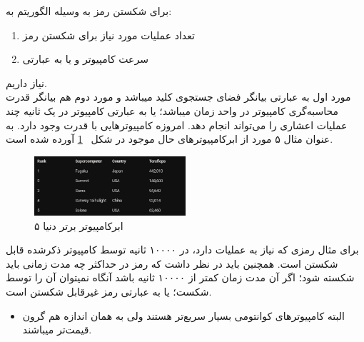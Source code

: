 \documentclass{article}
\begin{document}
برای شکستن رمز به وسیله الگوریتم  به:
\begin{enumerate}
\item تعداد عملیات مورد نیاز برای شکستن رمز
\item سرعت کامپیوتر و یا به عبارتی 
\end{enumerate}
نیاز داریم. \\
مورد اول به عبارتی بیانگر فضای جستجوی کلید میباشد و مورد دوم هم بیانگر قدرت محاسبه‌گری کامپیوتر در واحد زمان میباشد؛ یا به عبارتی کامپیوتر در یک ثانیه چند عملیات اعشاری را می‌تواند انجام دهد. امروزه کامپیوترهایی با قدرت  وجود دارد.
به عنوان مثال ۵ مورد از ابرکامپیوترهای حال موجود در شکل ~\ref{fig1} آورده شده است.
\begin{figure}[h]
\centering
\includegraphics[width=0.5\textwidth]{1.png}
\caption{۵ ابرکامپیوتر برتر دنیا}
\label{fig1}
\end{figure}
برای مثال رمزی که نیاز به  عملیات دارد، در ۱۰۰۰۰ ثانیه توسط کامپیوتر ذکرشده قابل شکستن است. همچنین باید در نظر داشت که رمز در حداکثر چه مدت زمانی باید شکسته شود؛ اگر آن مدت زمان کمتر از ۱۰۰۰۰ ثانیه باشد آنگاه نمیتوان آن را توسط  شکست؛ یا به عبارتی رمز غیرقابل شکستن است.
\begin{itemize}
\item البته کامپیوترهای کوانتومی بسیار سریع‌تر هستند ولی به همان اندازه هم گرون قیمت‌تر میباشند.
\end{itemize}
\newpage
\end{document}
